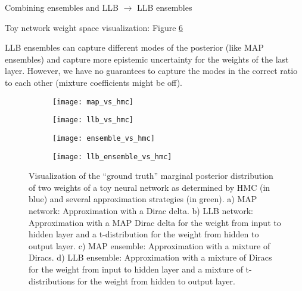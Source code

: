 \documentclass[../thesis.tex]{subfiles}
\begin{document}
Combining ensembles and LLB $\rightarrow$ LLB ensembles
\bigskip

Toy network weight space visualization: Figure \ref{fig:weight-space-approximations} 
\bigskip

LLB ensembles can capture different modes of the posterior (like MAP ensembles) and capture more epistemic uncertainty for the weights of the last layer. However, we have no guarantees to capture the modes in the correct ratio to each other (mixture coefficients might be off). 

\begin{figure}[h!]
    \centering
    \begin{subfigure}{\textwidth}
    \texttt{[image: map\_vs\_hmc]} 
    \label{fig:subim1}
    \end{subfigure}

    \begin{subfigure}{\textwidth}
    \texttt{[image: llb\_vs\_hmc]}
    \label{fig:subim2}
    \end{subfigure}

    \begin{subfigure}{\textwidth}
    \texttt{[image: ensemble\_vs\_hmc]}
    \label{fig:subim3}
    \end{subfigure}

\end{figure}


\begin{figure}[h!]\ContinuedFloat
    \begin{subfigure}{\textwidth}
    \texttt{[image: llb\_ensemble\_vs\_hmc]}
    \label{fig:subim4}
    \end{subfigure}

    \caption{Visualization of the ``ground truth'' marginal posterior distribution of two weights of a toy neural network as determined by HMC (in blue) and several approximation strategies (in green). a) MAP network: Approximation with a Dirac delta. b) LLB network: Approximation with a MAP Dirac delta for the weight from input to hidden layer and a t-distribution for the weight from hidden to output layer. c) MAP ensemble: Approximation with a mixture of Diracs. d) LLB ensemble: Approximation with a mixture of Diracs for the weight from input to hidden layer and a mixture of t-distributions for the weight from hidden to output layer.}
    \label{fig:weight-space-approximations}
\end{figure}
\end{document}
